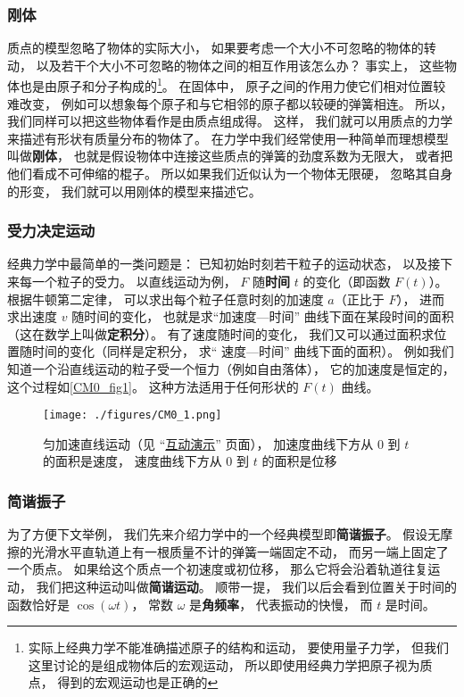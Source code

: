 \subsubsection{刚体}
质点的模型忽略了物体的实际大小， 如果要考虑一个大小不可忽略的物体的转动， 以及若干个大小不可忽略的物体之间的相互作用该怎么办？ 事实上， 这些物体也是由原子和分子构成的\footnote{实际上经典力学不能准确描述原子的结构和运动， 要使用量子力学， 但我们这里讨论的是组成物体后的宏观运动， 所以即使用经典力学把原子视为质点， 得到的宏观运动也是正确的}。 在固体中， 原子之间的作用力使它们相对位置较难改变， 例如可以想象每个原子和与它相邻的原子都以较硬的弹簧相连。 所以， 我们同样可以把这些物体看作是由质点组成得。 这样， 我们就可以用质点的力学来描述有形状有质量分布的物体了。 在力学中我们经常使用一种简单而理想模型叫做\textbf{刚体}， 也就是假设物体中连接这些质点的弹簧的劲度系数为无限大， 或者把他们看成不可伸缩的棍子。 所以如果我们近似认为一个物体无限硬， 忽略其自身的形变， 我们就可以用刚体的模型来描述它。

\subsubsection{受力决定运动}
经典力学中最简单的一类问题是： 已知初始时刻若干粒子的运动状态， 以及接下来每一个粒子的受力。 以直线运动为例， $F$ 随\textbf{时间} $t$ 的变化（即函数 $F(t)$）。 根据牛顿第二定律， 可以求出每个粒子任意时刻的加速度 $a$（正比于 $F$）， 进而求出速度 $v$ 随时间的变化， 也就是求“加速度—时间” 曲线下面在某段时间的面积（这在数学上叫做\textbf{定积分}）。 有了速度随时间的变化， 我们又可以通过面积求位置随时间的变化（同样是定积分， 求“ 速度—时间” 曲线下面的面积）。 例如我们知道一个沿直线运动的粒子受一个恒力（例如自由落体）， 它的加速度是恒定的， 这个过程如\autoref{CM0_fig1}。 这种方法适用于任何形状的 $F(t)$ 曲线。

\begin{figure}[ht]
\centering
\texttt{[image: ./figures/CM0\_1.png]}
\caption{匀加速直线运动（见 “\href{https://wuli.wiki/apps/consta.html}{互动演示}” 页面）， 加速度曲线下方从 $0$ 到 $t$ 的面积是速度， 速度曲线下方从 $0$ 到 $t$ 的面积是位移} \label{CM0_fig1}
\end{figure}

\subsubsection{简谐振子}
为了方便下文举例， 我们先来介绍力学中的一个经典模型即\textbf{简谐振子}。 假设无摩擦的光滑水平直轨道上有一根质量不计的弹簧一端固定不动， 而另一端上固定了一个质点。 如果给这个质点一个初速度或初位移， 那么它将会沿着轨道往复运动， 我们把这种运动叫做\textbf{简谐运动}。 顺带一提， 我们以后会看到位置关于时间的函数恰好是 $\cos(\omega t)$， 常数 $\omega$ 是\textbf{角频率}， 代表振动的快慢， 而 $t$ 是时间。

